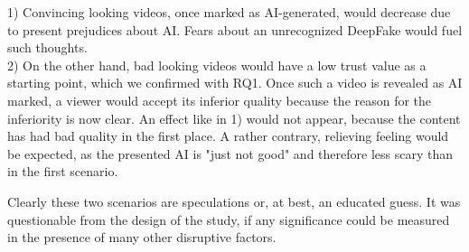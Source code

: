 \documentclass[
  a4paper,  %
  twoside,  %
  bibliography=totoc,
  headsepline,
  cleardoublepage=empty,
  parskip=half,
  draft=false
]{scrbook}
\begin{document}
1) Convincing looking videos, once marked as AI-generated, would decrease due to present prejudices about AI. Fears about an unrecognized DeepFake would fuel such thoughts. \\
2) On the other hand, bad looking videos would have a low trust value as a starting point, which we confirmed with RQ1. Once such a video is revealed as AI marked, a viewer would accept its inferior quality because the reason for the inferiority is now clear. An effect like in 1) would not appear, because the content has had bad quality in the first place. A rather contrary, relieving feeling would be expected, as the presented AI is "just not good" and therefore less scary than in the first scenario.

Clearly these two scenarios are speculations or, at best, an educated guess. It was questionable from the design of the study, if any significance could be measured in the presence of many other disruptive factors.
\end{document}
